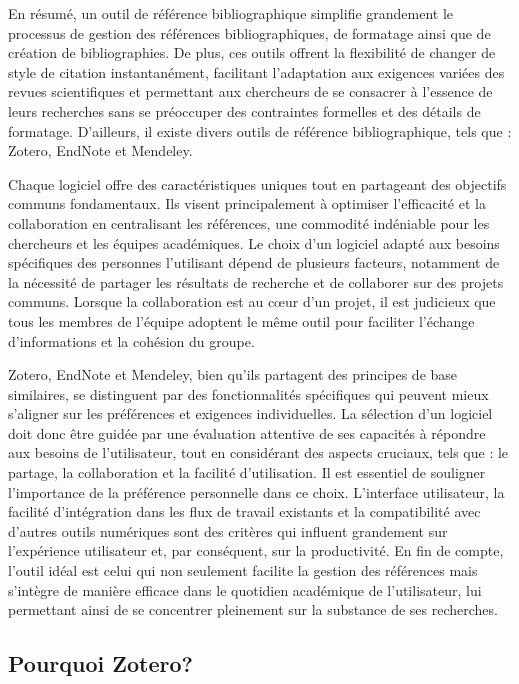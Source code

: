 \documentclass[
  letterpaper,
  DIV=11,
  numbers=noendperiod]{scrreprt}
\begin{document}
En résumé, un outil de référence bibliographique simplifie grandement le
processus de gestion des références bibliographiques, de formatage ainsi
que de création de bibliographies. De plus, ces outils offrent la
flexibilité de changer de style de citation instantanément, facilitant
l'adaptation aux exigences variées des revues scientifiques et
permettant aux chercheurs de se consacrer à l'essence de leurs
recherches sans se préoccuper des contraintes formelles et des détails
de formatage. D'ailleurs, il existe divers outils de référence
bibliographique, tels que : Zotero, EndNote et Mendeley.

Chaque logiciel offre des caractéristiques uniques tout en partageant
des objectifs communs fondamentaux. Ils visent principalement à
optimiser l'efficacité et la collaboration en centralisant les
références, une commodité indéniable pour les chercheurs et les équipes
académiques. Le choix d'un logiciel adapté aux besoins spécifiques des
personnes l'utilisant dépend de plusieurs facteurs, notamment de la
nécessité de partager les résultats de recherche et de collaborer sur
des projets communs. Lorsque la collaboration est au cœur d'un projet,
il est judicieux que tous les membres de l'équipe adoptent le même outil
pour faciliter l'échange d'informations et la cohésion du groupe.

Zotero, EndNote et Mendeley, bien qu'ils partagent des principes de base
similaires, se distinguent par des fonctionnalités spécifiques qui
peuvent mieux s'aligner sur les préférences et exigences individuelles.
La sélection d'un logiciel doit donc être guidée par une évaluation
attentive de ses capacités à répondre aux besoins de l'utilisateur, tout
en considérant des aspects cruciaux, tels que : le partage, la
collaboration et la facilité d'utilisation. Il est essentiel de
souligner l'importance de la préférence personnelle dans ce choix.
L'interface utilisateur, la facilité d'intégration dans les flux de
travail existants et la compatibilité avec d'autres outils numériques
sont des critères qui influent grandement sur l'expérience utilisateur
et, par conséquent, sur la productivité. En fin de compte, l'outil idéal
est celui qui non seulement facilite la gestion des références mais
s'intègre de manière efficace dans le quotidien académique de
l'utilisateur, lui permettant ainsi de se concentrer pleinement sur la
substance de ses recherches.

\subsection{Pourquoi Zotero?}\label{pourquoi-zotero}
\end{document}
